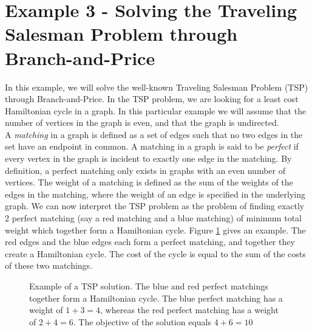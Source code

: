 \documentclass[a4paper]{article}
\begin{document}
\section{Example 3 - Solving the Traveling Salesman Problem through Branch-and-Price}\label{sec:tsp}
In this example, we will solve the well-known Traveling Salesman Problem (TSP) through Branch-and-Price. In the TSP problem, we are looking for a least cost Hamiltonian cycle in a graph. In this particular example we will assume that the number of vertices in the graph is even, and that the graph is undirected.\\
A \emph{matching} in a graph is defined as a set of edges such that no two edges in the set have an endpoint in common. A matching in a graph is said to be \emph{perfect} if every vertex in the graph is incident to exactly one edge in the matching. By definition, a perfect matching only exists in graphs with an even number of vertices. The weight of a matching is defined as the sum of the weights of the edges in the matching, where the weight of an edge is specified in the underlying graph. We can now interpret the TSP problem as the problem of finding exactly 2 perfect matching (say a red matching and a blue matching) of minimum total weight which together form a Hamiltonian cycle. Figure \ref{fig:tsp_example} gives an example. The red edges and the blue edges each form a perfect matching, and together they create a Hamiltonian cycle. The cost of the cycle is equal to the sum of the costs of these two matchings.\\
\begin{figure}
\centering
{}
\caption[Example of a TSP solution.]{Example of a TSP solution. The blue and red perfect matchings together form a Hamiltonian cycle. The blue perfect matching has a weight of $1+3=4$, whereas the red perfect matching has a weight of $2+4=6$. The objective of the solution equals $4+6=10$}
\label{fig:tsp_example}
\end{figure}
\end{document}
